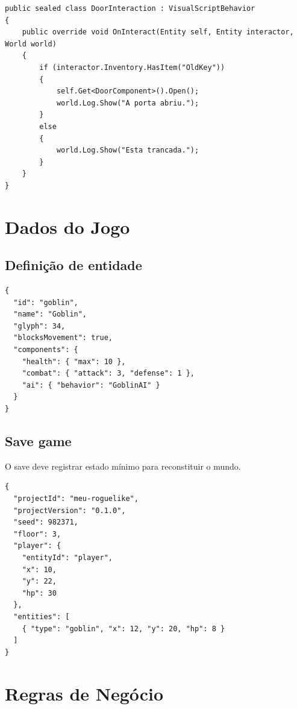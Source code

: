 \documentclass[12pt,a4paper]{article}
\begin{document}
\begin{lstlisting}[language={[Sharp]C},caption={Exemplo simplificado de C\# gerado por visual script.}]
public sealed class DoorInteraction : VisualScriptBehavior
{
    public override void OnInteract(Entity self, Entity interactor, World world)
    {
        if (interactor.Inventory.HasItem("OldKey"))
        {
            self.Get<DoorComponent>().Open();
            world.Log.Show("A porta abriu.");
        }
        else
        {
            world.Log.Show("Esta trancada.");
        }
    }
}
\end{lstlisting}

\section{Dados do Jogo}

\subsection{Definição de entidade}

\begin{lstlisting}[language={},caption={Exemplo de entidade em JSON.}]
{
  "id": "goblin",
  "name": "Goblin",
  "glyph": 34,
  "blocksMovement": true,
  "components": {
    "health": { "max": 10 },
    "combat": { "attack": 3, "defense": 1 },
    "ai": { "behavior": "GoblinAI" }
  }
}
\end{lstlisting}

\subsection{Save game}

O save deve registrar estado mínimo para reconstituir o mundo.

\begin{lstlisting}[language={},caption={Exemplo de save game.}]
{
  "projectId": "meu-roguelike",
  "projectVersion": "0.1.0",
  "seed": 982371,
  "floor": 3,
  "player": {
    "entityId": "player",
    "x": 10,
    "y": 22,
    "hp": 30
  },
  "entities": [
    { "type": "goblin", "x": 12, "y": 20, "hp": 8 }
  ]
}
\end{lstlisting}

\section{Regras de Negócio}
\end{document}
